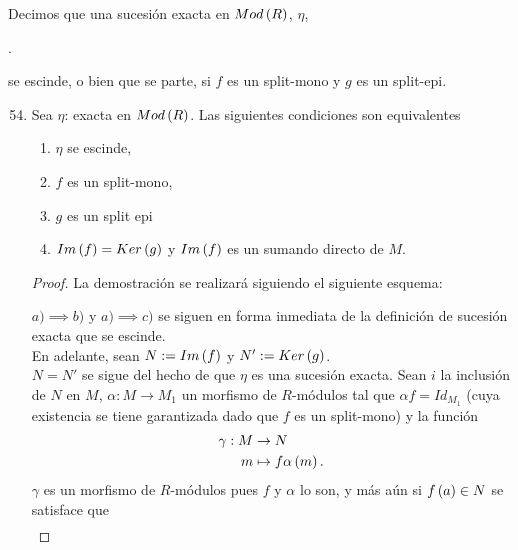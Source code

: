 \documentclass{article}
\begin{document}
	\begin{define}
		Decimos que una sucesión exacta en $Mod\left(R\right)$, $\eta$, \begin{center}
			.
		\end{center}
		se escinde, o bien que se parte, si $f$ es un split-mono y $g$ es un split-epi.			
	\end{define}
	\begin{enumerate}[label=\textbf{Ej \arabic*.}]
		\setcounter{enumi}{53}
		\item Sea $\eta$:
		exacta en $Mod\left(R\right)$. Las siguientes condiciones son equivalentes
		\begin{enumerate}
			\item $\eta$ se escinde,
			\item $f$ es un split-mono,
			\item $g$ es un split epi
			\item $Im\left(f\right)=Ker\left(g\right)$ y $Im\left(f\right)$ es un sumando directo de $M$.
		\end{enumerate}
		\begin{proof}
			La demostración se realizará siguiendo el siguiente esquema:
			\begin{center}
			\end{center}
			$a)\implies b)$ y $a)\implies c)$ se siguen en forma inmediata de la definición de sucesión exacta que se escinde.\\
			En adelante, sean $N:=Im\left(f\right)$ y $N':=Ker\left(g\right)$.\\
			 $N=N'$ se sigue del hecho de que $\eta$ es una sucesión exacta. Sean $i$ la inclusión de $N$ en $M$, $\alpha:M\to M_1$ un morfismo de $R$-módulos tal que $\alpha f=Id_{M_1}$ (cuya existencia se tiene garantizada dado que $f$ es un split-mono) y la función
			\begin{align*}
				\gamma: M &\rightarrow N\\ m &\mapsto f\alpha\left(m\right).
			\end{align*}
			$\gamma$ es un morfismo de $R$-módulos pues $f$ y $\alpha$ lo son, y más aún si $f\left(a\right)\in N$ se satisface que
			\begin{align*}

\end{align*}
\end{proof}
\end{enumerate}
\end{document}
